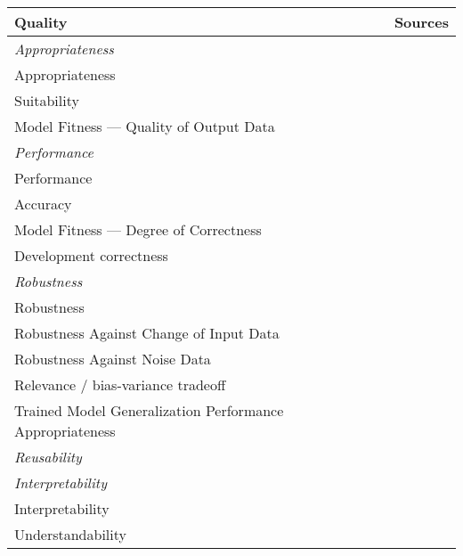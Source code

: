 \begin{table}[h]
    \centering\scriptsize
    \begin{tabular}{p{} p{}}
        \textbf{Quality} & \textbf{Sources} \\
        \toprule
        \textit{Appropriateness} \\
        Appropriateness &~\cite{siebert_construction_2021} \\
        Suitability &~\cite{siebert_construction_2021} \\
        Model Fitness --- Quality of Output Data &~\cite{nakamichi_requirements-driven_2020} \\
        \midrule
        \textit{Performance} \\
        Performance &~\cite{ashmore_assuring_2021,vogelsang_requirements_2019} \\
        Accuracy &~\cite{nakamichi_requirements-driven_2020} \\
        Model Fitness --- Degree of Correctness &~\cite{nakamichi_requirements-driven_2020,
                                                    zhang_machine_2020} \\
        Development correctness &~\cite{siebert_construction_2021} \\
        \midrule
        \textit{Robustness} \\
        Robustness &~\cite{ashmore_assuring_2021, hu_towards_2020, siebert_construction_2021} \\
        Robustness Against Change of Input Data &~\cite{nakamichi_requirements-driven_2020} \\
        Robustness Against Noise Data &~\cite{nakamichi_requirements-driven_2020} \\
        Relevance / bias-variance tradeoff &~\cite{siebert_construction_2021, zhang_machine_2020} \\
        Trained Model Generalization Performance Appropriateness
                                                    &~\cite{nakamichi_requirements-driven_2020} \\
        \midrule
        \textit{Reusability} &~\cite{ashmore_assuring_2021} \\
        \midrule
        \textit{Interpretability} \\
        Interpretability &~\cite{ashmore_assuring_2021, siebert_construction_2021, zhang_machine_2020}\\
        Understandability &~\cite{nakamichi_requirements-driven_2020} \\

\end{tabular}
\end{table}
